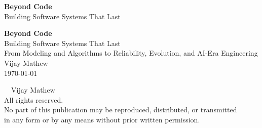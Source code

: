 \frontmatter
\pagestyle{frontstyle}

\thispagestyle{empty}
\vspace*{\fill}
\begin{center}
{\Huge\bfseries Beyond Code}\\[0.7em]
{\Large Building Software Systems That Last}
\end{center}
\vspace*{\fill}
\clearpage

\thispagestyle{empty}
\vspace*{0.20\textheight}
\begin{center}
{\Huge\bfseries Beyond Code}\\[0.9em]
{\LARGE Building Software Systems That Last}\\[1.4em]
{\large From Modeling and Algorithms to Reliability, Evolution, and AI-Era Engineering}\\[3.0em]
{\large Vijay Mathew}\\[0.5em]
{\large \today}
\end{center}
\clearpage

\thispagestyle{empty}
\vspace*{\fill}
\noindent\textcopyright\ \the\year\ Vijay Mathew\\
All rights reserved.\\
No part of this publication may be reproduced, distributed, or transmitted\\
in any form or by any means without prior written permission.
\vspace*{\fill}
\clearpage

\tableofcontents
\clearpage

\mainmatter
\pagestyle{mainstyle}
